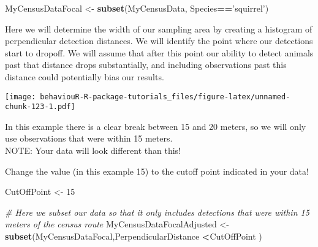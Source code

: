 \documentclass[]{book}
\newenvironment{Shaded}{\begin{snugshade}}{\end{snugshade}}
\newcommand{\CommentTok}[1]{\textcolor[rgb]{0.56,0.35,0.01}{\textit{#1}}}
\newcommand{\DataTypeTok}[1]{\textcolor[rgb]{0.13,0.29,0.53}{#1}}
\newcommand{\DecValTok}[1]{\textcolor[rgb]{0.00,0.00,0.81}{#1}}
\newcommand{\KeywordTok}[1]{\textcolor[rgb]{0.13,0.29,0.53}{\textbf{#1}}}
\newcommand{\NormalTok}[1]{#1}
\newcommand{\OperatorTok}[1]{\textcolor[rgb]{0.81,0.36,0.00}{\textbf{#1}}}
\newcommand{\StringTok}[1]{\textcolor[rgb]{0.31,0.60,0.02}{#1}}
\begin{document}
\begin{Shaded}
\begin{Highlighting}[]
\NormalTok{MyCensusDataFocal <-}\StringTok{ }\KeywordTok{subset}\NormalTok{(MyCensusData, Species}\OperatorTok{==}\StringTok{'squirrel'}\NormalTok{)}
\end{Highlighting}
\end{Shaded}

Here we will determine the width of our sampling area by creating a histogram of perpendicular detection distances. We will identify the point where our detections start to dropoff. We will assume that after this point our ability to detect animals past that distance drops substantially, and including observations past this distance could potentially bias our results.

\begin{Shaded}
\end{Shaded}

\texttt{[image: behaviouR-R-package-tutorials\_files/figure-latex/unnamed-chunk-123-1.pdf]}

In this example there is a clear break between 15 and 20 meters, so we will only use observations that were within 15 meters.\\
NOTE: Your data will look different than this!

Change the value (in this example 15) to the cutoff point indicated in your data!

\begin{Shaded}
\begin{Highlighting}[]
\NormalTok{CutOffPoint <-}\StringTok{ }\DecValTok{15}
\end{Highlighting}
\end{Shaded}

\begin{Shaded}
\begin{Highlighting}[]
\CommentTok{# Here we subset our data so that it only includes detections that were within 15 meters of the census route}
\NormalTok{MyCensusDataFocalAdjusted <-}\StringTok{ }\KeywordTok{subset}\NormalTok{(MyCensusDataFocal,PerpendicularDistance }\OperatorTok{<}\NormalTok{CutOffPoint )}
\end{Highlighting}
\end{Shaded}
\end{document}
